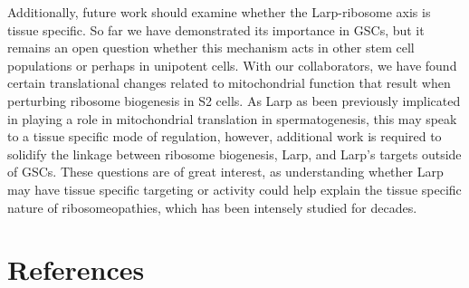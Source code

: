 \documentclass[12pt,oneside]{reedthesis}
\begin{document}
Additionally, future work should examine whether the Larp-ribosome axis is tissue specific. So far we have demonstrated its importance in GSCs, but it remains an open question whether this mechanism acts in other stem cell populations or perhaps in unipotent cells. With our collaborators, we have found certain translational changes related to mitochondrial function that result when perturbing ribosome biogenesis in S2 cells. As Larp as been previously implicated in playing a role in mitochondrial translation in spermatogenesis, this may speak to a tissue specific mode of regulation, however, additional work is required to solidify the linkage between ribosome biogenesis, Larp, and Larp's targets outside of GSCs. These questions are of great interest, as understanding whether Larp may have tissue specific targeting or activity could help explain the tissue specific nature of ribosomeopathies, which has been intensely studied for decades.

\backmatter

\hypertarget{references}{%
\chapter*{References}\label{references}}


\noindent

\setlength{\parindent}{-0.20in}
\setlength{\leftskip}{0.20in}
\setlength{\parskip}{8pt}
\end{document}
